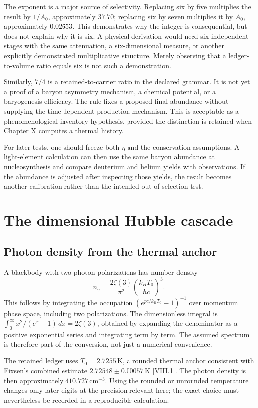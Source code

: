 The exponent is a major source of selectivity. Replacing six by five multiplies the result by $1/A_0$, approximately $37.70$; replacing six by seven multiplies it by $A_0$, approximately $0.02653$. This demonstrates why the integer is consequential, but does not explain why it is six. A physical derivation would need six independent stages with the same attenuation, a six-dimensional measure, or another explicitly demonstrated multiplicative structure. Merely observing that a ledger-to-volume ratio equals six is not such a demonstration.

Similarly, $7/4$ is a retained-to-carrier ratio in the declared grammar. It is not yet a proof of a baryon asymmetry mechanism, a chemical potential, or a baryogenesis efficiency. The rule fixes a proposed final abundance without supplying the time-dependent production mechanism. This is acceptable as a phenomenological inventory hypothesis, provided the distinction is retained when Chapter X computes a thermal history.

For later tests, one should freeze both $\eta$ and the conservation assumptions. A light-element calculation can then use the same baryon abundance at nucleosynthesis and compare deuterium and helium yields with observations. If the abundance is adjusted after inspecting those yields, the result becomes another calibration rather than the intended out-of-selection test.

\section{The dimensional Hubble cascade}
\subsection{Photon density from the thermal anchor}
A blackbody with two photon polarizations has number density
\begin{equation}
 n_\gamma=\frac{2\zeta(3)}{\pi^2}
 \left(\frac{k_BT_0}{\hbar c}\right)^3.
 \label{c8:photons}
\end{equation}
This follows by integrating the occupation $(e^{pc/k_BT_0}-1)^{-1}$ over momentum phase space, including two polarizations. The dimensionless integral is $\int_0^\infty x^2/(e^x-1)\,dx=2\zeta(3)$, obtained by expanding the denominator as a positive exponential series and integrating term by term. The assumed spectrum is therefore part of the conversion, not just a numerical convenience.

The retained ledger uses $T_0=2.7255\,\mathrm K$, a rounded thermal anchor consistent with Fixsen's combined estimate $2.72548\pm0.00057\,\mathrm K$ [VIII.1]. The photon density is then approximately $410.727\,\mathrm{cm^{-3}}$. Using the rounded or unrounded temperature changes only later digits at the precision relevant here; the exact choice must nevertheless be recorded in a reproducible calculation.

